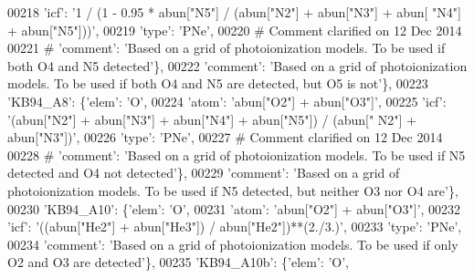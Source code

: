 \begin{DoxyCode}
00218                                       \textcolor{stringliteral}{'icf'}: \textcolor{stringliteral}{'1 / (1 - 0.95 * abun["N5"] / (abun["N2"] + abun["N3"] + abun[
      "N4"] + abun["N5"]))'},
00219                                       \textcolor{stringliteral}{'type'}: \textcolor{stringliteral}{'PNe'},
00220 \textcolor{comment}{# Comment clarified on 12 Dec 2014 }
00221 \textcolor{comment}{#                                      'comment': 'Based on a grid of photoionization models. To be used if
       both O4 and N5 detected'\},}
00222                                       \textcolor{stringliteral}{'comment'}: \textcolor{stringliteral}{'Based on a grid of photoionization models. To be used if
       both O4 and N5 are detected, but O5 is not'}\},
00223                          \textcolor{stringliteral}{'KB94\_A8'}: \{\textcolor{stringliteral}{'elem'}: \textcolor{stringliteral}{'O'},
00224                                      \textcolor{stringliteral}{'atom'}: \textcolor{stringliteral}{'abun["O2"] + abun["O3"]'},
00225                                      \textcolor{stringliteral}{'icf'}: \textcolor{stringliteral}{'(abun["N2"] + abun["N3"] + abun["N4"] + abun["N5"]) / (abun["
      N2"] + abun["N3"])'},
00226                                      \textcolor{stringliteral}{'type'}: \textcolor{stringliteral}{'PNe'},
00227 \textcolor{comment}{# Comment clarified on 12 Dec 2014 }
00228 \textcolor{comment}{#                                     'comment': 'Based on a grid of photoionization models. To be used if
       N5 detected and O4 not detected'\},}
00229                                      \textcolor{stringliteral}{'comment'}: \textcolor{stringliteral}{'Based on a grid of photoionization models. To be used if
       N5 detected, but neither O3 nor O4 are'}\},
00230                          \textcolor{stringliteral}{'KB94\_A10'}: \{\textcolor{stringliteral}{'elem'}: \textcolor{stringliteral}{'O'},
00231                                       \textcolor{stringliteral}{'atom'}: \textcolor{stringliteral}{'abun["O2"] + abun["O3"]'},
00232                                       \textcolor{stringliteral}{'icf'}: \textcolor{stringliteral}{'((abun["He2"] + abun["He3"]) / abun["He2"])**(2./3.)'},
00233                                       \textcolor{stringliteral}{'type'}: \textcolor{stringliteral}{'PNe'},
00234                                       \textcolor{stringliteral}{'comment'}: \textcolor{stringliteral}{'Based on a grid of photoionization models. To be used if
       only O2 and O3 are detected'}\},
00235                          \textcolor{stringliteral}{'KB94\_A10b'}: \{\textcolor{stringliteral}{'elem'}: \textcolor{stringliteral}{'O'},

\end{DoxyCode}
